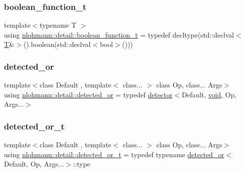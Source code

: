 \subsubsection{\texorpdfstring{boolean\_function\_t}{boolean\_function\_t}}
{\footnotesize\ttfamily template$<$typename T $>$ \\
using \mbox{\hyperlink{namespacenlohmann_1_1detail_a45ec87326503b8884b664a9ef23a6c99}{nlohmann\+::detail\+::boolean\+\_\+function\+\_\+t}} = typedef decltype(std\+::declval$<$\mbox{\hyperlink{_keyboard_event_8h_adf1f3edb9115acb0a1e04209b7a9937b}{T}}\&$>$().boolean(std\+::declval$<$bool$>$()))}

\mbox{\label{namespacenlohmann_1_1detail_a240ce21919ab08e8a6cb3a5cfa412bce}} 
\subsubsection{\texorpdfstring{detected\_or}{detected\_or}}
{\footnotesize\ttfamily template$<$class Default , template$<$ class... $>$ class Op, class... Args$>$ \\
using \mbox{\hyperlink{namespacenlohmann_1_1detail_a240ce21919ab08e8a6cb3a5cfa412bce}{nlohmann\+::detail\+::detected\+\_\+or}} = typedef \mbox{\hyperlink{structnlohmann_1_1detail_1_1detector}{detector}}$<$Default, \mbox{\hyperlink{namespacenlohmann_1_1detail_a59fca69799f6b9e366710cb9043aa77d}{void}}, Op, Args...$>$}

\mbox{\label{namespacenlohmann_1_1detail_a7ac5b8ef0363101275a2827b3b117dcf}} 
\subsubsection{\texorpdfstring{detected\_or\_t}{detected\_or\_t}}
{\footnotesize\ttfamily template$<$class Default , template$<$ class... $>$ class Op, class... Args$>$ \\
using \mbox{\hyperlink{namespacenlohmann_1_1detail_a7ac5b8ef0363101275a2827b3b117dcf}{nlohmann\+::detail\+::detected\+\_\+or\+\_\+t}} = typedef typename \mbox{\hyperlink{namespacenlohmann_1_1detail_a240ce21919ab08e8a6cb3a5cfa412bce}{detected\+\_\+or}}$<$Default, Op, Args...$>$\+::type}

